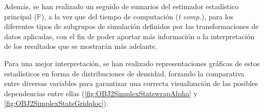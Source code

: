 \documentclass[IB,BIB]{TFUOC}%
\begin{document}
Además, se han realizado un seguido de sumarios del estimador estadístico principal (\( \mathbb P \)), a la vez que del tiempo de computación (\textit{t comp.}), para los diferentes tipos de subgrupos de simulación definidos por las transformaciones de datos aplicadas, con el fin de poder aportar más información a la interpretación de los resultados que se mostrarán más adelante.

Para una mejor interpretación, se han realizado representaciones gráficas de estos estadísticos en forma de distribuciones de densidad, forzando la comparativa entre diversas variables para garantizar una correcta visualización de las posibles dependencias entre ellas (\ref{fig:OBJ2SimplexStatswrapAlpha} y \ref{fig:OBJ2SimplexStatsGridqloc}).

\newpage
\end{document}
